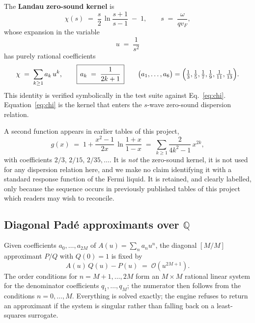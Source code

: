 \documentclass[11pt,a4paper]{article}
\begin{document}
The \textbf{Landau zero-sound kernel} is
\begin{equation}
  \chi(s) \;=\; \frac{s}{2}\,\ln\!\frac{s+1}{s-1} \;-\; 1,
  \qquad s \;=\; \frac{\omega}{q v_F},
  \label{eq:chi}
\end{equation}
whose expansion in the variable
\begin{equation}
  u \;=\; \frac{1}{s^{2}}
\end{equation}
has purely rational coefficients
\begin{equation}
  \chi \;=\; \sum_{k\ge 1} a_k\, u^{k},
  \qquad
  \boxed{\,a_k \;=\; \frac{1}{2k+1}\,}
  \qquad
  \bigl(a_1,\dots,a_6\bigr) = \Bigl(\tfrac13,\tfrac15,\tfrac17,\tfrac19,\tfrac1{11},\tfrac1{13}\Bigr).
  \label{eq:ak}
\end{equation}
This identity is verified symbolically in the test suite against
Eq.~\eqref{eq:chi}. Equation~\eqref{eq:chi} is the kernel that enters the
$s$-wave zero-sound dispersion relation.

A second function appears in earlier tables of this project,
\begin{equation}
  g(x) \;=\; 1 + \frac{x^{2}-1}{2x}\,\ln\frac{1+x}{1-x}
  \;=\; \sum_{k\ge1} \frac{2}{4k^{2}-1}\, x^{2k},
  \label{eq:g}
\end{equation}
with coefficients $2/3,\,2/15,\,2/35,\dots$. It is \emph{not} the zero-sound
kernel, it is not used for any dispersion relation here, and we make no claim
identifying it with a standard response function of the Fermi liquid. It is
retained, and clearly labelled, only because the sequence occurs in previously
published tables of this project which readers may wish to reconcile.

\subsection{Diagonal Pad\'e approximants over $\mathbb{Q}$}

Given coefficients $a_0,\dots,a_{2M}$ of $A(u) = \sum_n a_n u^n$, the diagonal
$[M/M]$ approximant $P/Q$ with $Q(0)=1$ is fixed by
\begin{equation}
  A(u)\,Q(u) - P(u) \;=\; \mathcal{O}\!\left(u^{2M+1}\right).
\end{equation}
The order conditions for $n = M+1,\dots,2M$ form an $M\times M$ rational linear
system for the denominator coefficients $q_1,\dots,q_M$; the numerator then
follows from the conditions $n=0,\dots,M$. Everything is solved exactly; the
engine refuses to return an approximant if the system is singular rather than
falling back on a least-squares surrogate.
\end{document}
